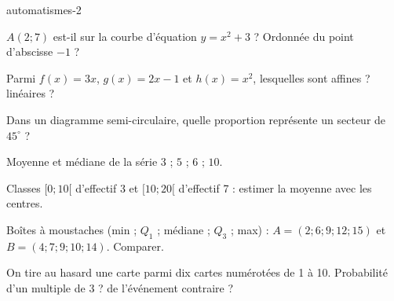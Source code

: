 \begin{blocEdition}{automatismes-2}
\begin{deuxcolonnes}
\begin{questions}
\item \begin{minipage}[t]{\linewidth}\raggedright\leavevmode $A(2;7)$ est-il sur la courbe d’équation $y=x^2+3$ ? Ordonnée du point d’abscisse $-1$ ?\end{minipage}
\item \begin{minipage}[t]{\linewidth}\raggedright\leavevmode Parmi $f(x)=3x$, $g(x)=2x-1$ et $h(x)=x^2$, lesquelles sont affines ? linéaires ?\end{minipage}
\item \begin{minipage}[t]{\linewidth}\raggedright\leavevmode Dans un diagramme semi-circulaire, quelle proportion représente un secteur de $45^\circ$ ?\end{minipage}
\item \begin{minipage}[t]{\linewidth}\raggedright\leavevmode Moyenne et médiane de la série $3$ ; $5$ ; $6$ ; $10$.\end{minipage}
\item \begin{minipage}[t]{\linewidth}\raggedright\leavevmode Classes $[0;10[$ d’effectif 3 et $[10;20[$ d’effectif 7 : estimer la moyenne avec les centres.\end{minipage}
\item \begin{minipage}[t]{\linewidth}\raggedright\leavevmode Boîtes à moustaches (min ; $Q_1$ ; médiane ; $Q_3$ ; max) : $A=(2;6;9;12;15)$ et $B=(4;7;9;10;14)$. Comparer.\end{minipage}
\item \begin{minipage}[t]{\linewidth}\raggedright\leavevmode On tire au hasard une carte parmi dix cartes numérotées de 1 à 10. Probabilité d’un multiple de 3 ? de l’événement contraire ?\end{minipage}
\end{questions}\end{deuxcolonnes}

\end{blocEdition}
